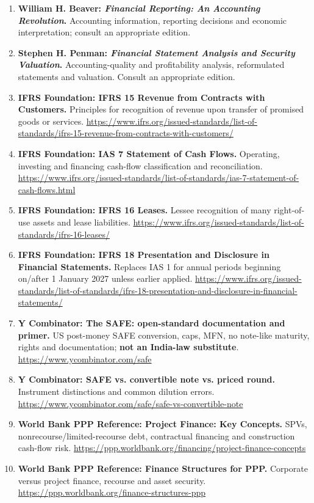 \begin{enumerate}
    \item \textbf{William H. Beaver: \textit{Financial Reporting: An Accounting Revolution}.} Accounting information, reporting decisions and economic interpretation; consult an appropriate edition.
    \item \textbf{Stephen H. Penman: \textit{Financial Statement Analysis and Security Valuation}.} Accounting-quality and profitability analysis, reformulated statements and valuation. Consult an appropriate edition.
    \item \textbf{IFRS Foundation: IFRS 15 Revenue from Contracts with Customers.} Principles for recognition of revenue upon transfer of promised goods or services. \url{https://www.ifrs.org/issued-standards/list-of-standards/ifrs-15-revenue-from-contracts-with-customers/}
    \item \textbf{IFRS Foundation: IAS 7 Statement of Cash Flows.} Operating, investing and financing cash-flow classification and reconciliation. \url{https://www.ifrs.org/issued-standards/list-of-standards/ias-7-statement-of-cash-flows.html}
    \item \textbf{IFRS Foundation: IFRS 16 Leases.} Lessee recognition of many right-of-use assets and lease liabilities. \url{https://www.ifrs.org/issued-standards/list-of-standards/ifrs-16-leases/}
    \item \textbf{IFRS Foundation: IFRS 18 Presentation and Disclosure in Financial Statements.} Replaces IAS 1 for annual periods beginning on/after 1 January 2027 unless earlier applied. \url{https://www.ifrs.org/issued-standards/list-of-standards/ifrs-18-presentation-and-disclosure-in-financial-statements/}
    \item \textbf{Y Combinator: The SAFE: open-standard documentation and primer.} US post-money SAFE conversion, caps, MFN, no note-like maturity, rights and documentation; \textbf{not an India-law substitute}. \url{https://www.ycombinator.com/safe}
    \item \textbf{Y Combinator: SAFE vs. convertible note vs. priced round.} Instrument distinctions and common dilution errors. \url{https://www.ycombinator.com/safe/safe-vs-convertible-note}
    \item \textbf{World Bank PPP Reference: Project Finance: Key Concepts.} SPVs, nonrecourse/limited-recourse debt, contractual financing and construction cash-flow risk. \url{https://ppp.worldbank.org/financing/project-finance-concepts}
    \item \textbf{World Bank PPP Reference: Finance Structures for PPP.} Corporate versus project finance, recourse and asset security. \url{https://ppp.worldbank.org/finance-structures-ppp}

\end{enumerate}
